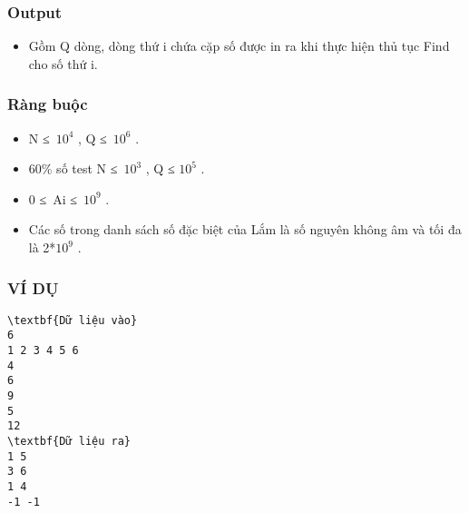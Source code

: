 \subsubsection{\textbf{Output}}
\begin{itemize}
	\item Gồm Q dòng, dòng thứ i chứa cặp số được in ra khi thực hiện thủ tục Find cho số thứ i.
\end{itemize}

\subsubsection{\textbf{Ràng buộc}}
\begin{itemize}
	\item N ≤ $10^{4}$ , Q ≤ $10^{6}$ .
	\item 60\% số test N ≤ $10^{3}$ , Q ≤ $10^{5}$ .
	\item 0 ≤ Ai ≤ $10^{9}$ .
	\item Các số trong danh sách số đặc biệt của Lắm là số nguyên không âm và tối đa là 2*$10^{9}$ .
\end{itemize}

\subsubsection{\textbf{VÍ DỤ }}
\begin{verbatim}
\textbf{Dữ liệu vào}
6
1 2 3 4 5 6
4
6
9
5
12
\textbf{Dữ liệu ra}
1 5
3 6
1 4
-1 -1
\end{verbatim}
